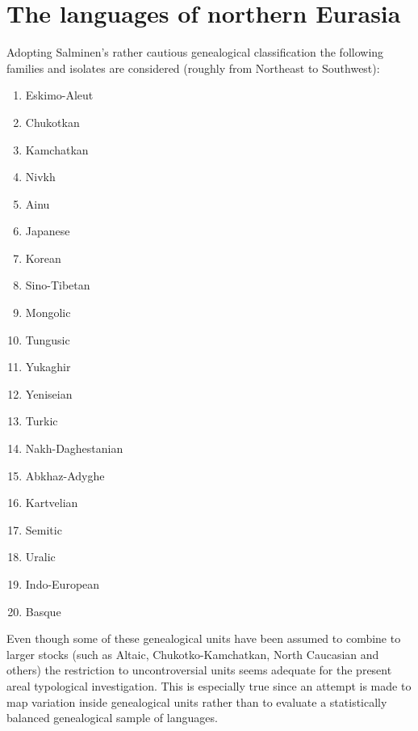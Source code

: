 \section{The languages of northern Eurasia}
Adopting Salminen's rather cautious genealogical classification the following families and isolates are considered (roughly from Northeast to Southwest):
\begin{multicols}{2}
\begin{enumerate}
\item{Eskimo-Aleut}
\item{Chukotkan}
\item{Kamchatkan}
\item{Nivkh}
\item{Ainu}
\item{Japanese}
\item{Korean}
\item{Sino-Tibetan}
\item{Mongolic}
\item{Tungusic}
\item{Yukaghir}
\item{Yeniseian}
\item{Turkic}
\item{Nakh-Daghestanian}
\item{Abkhaz-Adyghe}
\item{Kartvelian}
\item{Semitic}
\item{Uralic}
\item{Indo-European}
\item{Basque}
\end{enumerate}
\end{multicols}
Even though some of these genealogical units have been assumed to combine to larger stocks (such as Altaic, Chukotko-Kamchatkan, North Caucasian and others) the restriction to uncontroversial units seems adequate for the present areal typological investigation. This is especially true since an attempt is made to map variation inside genealogical units rather than to evaluate a statistically balanced genealogical sample of languages.

